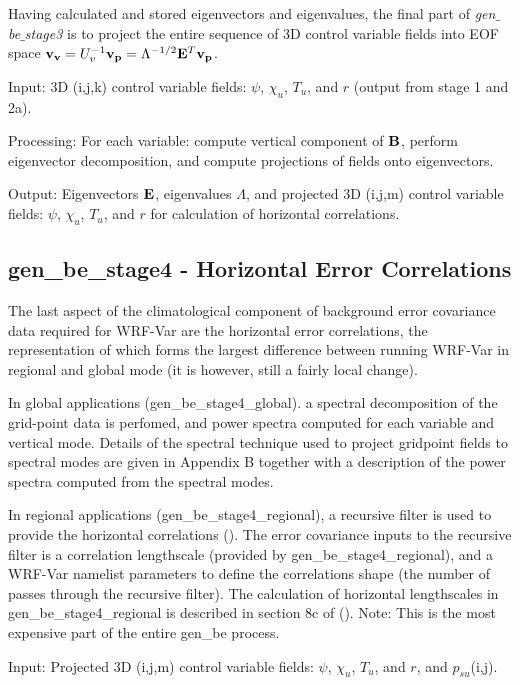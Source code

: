Having calculated and stored eigenvectors and eigenvalues, the final
part of {\it gen$\_$be$\_$stage3} is to project the entire sequence of
3D control variable fields into EOF space ${\bf v_v}=U_{v}^{-1}{\bf
v_p}=\Lambda^{-1/2}{\bf E}^{T} {\bf v_p}$.

Input: 3D (i,j,k) control variable fields: $\psi$, $\chi_u$,  $T_u$, and $r$ (output from stage 1 and 2a).

Processing: For each variable: compute vertical component of ${\bf B}$, perform eigenvector decomposition, and compute projections of fields onto eigenvectors.

Output: Eigenvectors $\bf E$, eigenvalues $\Lambda$, and projected 3D (i,j,m) control variable fields:  $\psi$, $\chi_u$,  $T_u$, and $r$ for calculation of horizontal correlations.


\subsection{gen\_be\_stage4 - Horizontal Error Correlations}

The last aspect of the climatological component of background error covariance data required for WRF-Var are the horizontal error correlations, the representation of which forms the largest difference between running WRF-Var in regional and global mode (it is however, still a fairly local change).

In global applications (gen\_be\_stage4\_global). a spectral decomposition of the grid-point data is perfomed, and power spectra computed for each variable and vertical mode. Details of the spectral technique used to project gridpoint fields to spectral modes are given in Appendix B together with a description of the power spectra computed from the spectral modes.

In regional applications (gen\_be\_stage4\_regional), a recursive filter is used to provide the horizontal correlations (\citet{barker04}). The error covariance inputs to the recursive filter is a correlation lengthscale (provided by gen\_be\_stage4\_regional), and a WRF-Var namelist parameters to define the correlations shape (the number of passes through the recursive filter).  The calculation of horizontal lengthscales in gen\_be\_stage4\_regional is described in section 8c of (\citet{barker04}). Note: This is the most expensive part of the entire gen\_be process.

Input: Projected 3D (i,j,m) control variable fields: $\psi$, $\chi_u$,  $T_u$, and $r$, and $p_{su}$(i,j).

